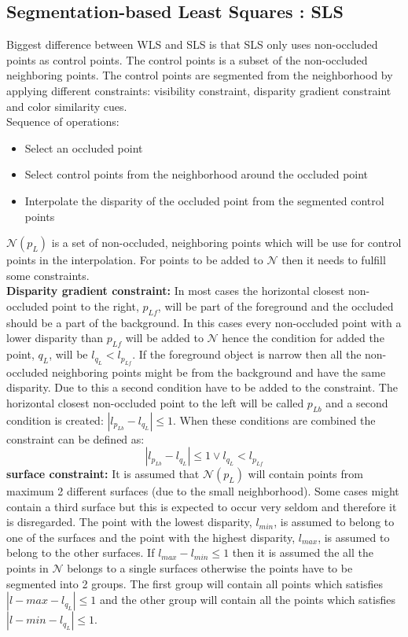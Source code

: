 \subsection{Segmentation-based Least Squares : SLS}\label{sec:sls}
Biggest difference between WLS and SLS is that SLS only uses non-occluded points as control points. The control points is a subset of the non-occluded neighboring points. The control points are segmented from the neighborhood by applying different constraints: visibility constraint, disparity gradient constraint and color similarity cues. \\
Sequence of operations:
\begin{itemize}
\item Select an occluded point
\item Select control points from the neighborhood around the occluded point
\item Interpolate the disparity of the occluded point from the segmented control points
\end{itemize}
$\mathcal{N}(p_L)$ is a set of non-occluded, neighboring points which will be use for control points in the interpolation. For points to be added to $\mathcal{N}$ then it needs to fulfill some constraints.\\
\textbf{Disparity gradient constraint:} In most cases the horizontal closest non-occluded point to the right, $p_{Lf}$, will be part of the foreground and the occluded should be a part of the background. In this cases every non-occluded point with a lower disparity than $p_{Lf}$ will be added to $\mathcal{N}$ hence the condition for added the point, $q_L$, will be $l_{q_L} < l_{p_{Lf}}$. If the foreground object is narrow then all the non-occluded neighboring points might be from the background and have the same disparity. Due to this a second condition have to be added to the constraint. The horizontal closest non-occluded point to the left will be called $p_{Lb}$ and a second condition is created: $| l_{p_{Lb}} - l_{q_L} | \leq 1$. When these conditions are combined the constraint can be defined as:
\begin{equation}
| l_{p_{Lb}} - l_{q_L} | \leq 1 \vee  l_{q_L} < l_{p_{Lf}}
\end{equation}
\textbf{surface constraint:} It is assumed that $\mathcal{N}(p_L)$ will contain points from maximum 2 different surfaces (due to the small neighborhood). Some cases might contain a third surface but this is expected to occur very seldom and therefore it is disregarded. The point with the lowest disparity, $l_{min}$, is assumed to belong to one of the surfaces and the point with the highest disparity, $l_{max}$, is assumed to belong to the other surfaces. If $l_{max} - l_{min} \leq 1$ then it is assumed the all the points in $\mathcal{N}$ belongs to a single surfaces otherwise the points have to be segmented into 2 groups. The first group will contain all points which satisfies $| l-{max} - l_{q_L} | \leq 1$ and the other group will contain all the points which satisfies $| l-{min} - l_{q_L} | \leq 1$.
